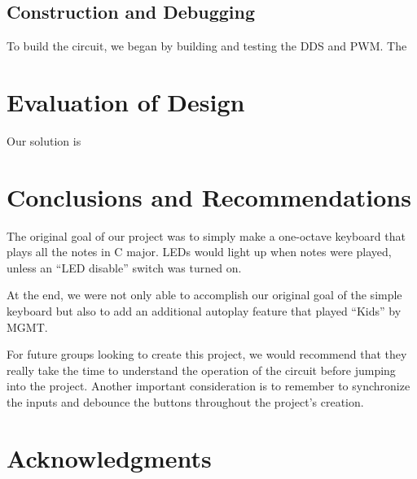 \documentclass{article}
\begin{document}
  \subsection{Construction and Debugging}


    To build the circuit, we began by building and testing the DDS and PWM. The

\section{Evaluation of Design}
  

  Our solution is 

\section{Conclusions and Recommendations}


  The original goal of our project was to simply make a one-octave keyboard that plays all the notes in C major. LEDs would light up when notes were played, unless an ``LED disable'' switch was turned on.

  At the end, we were not only able to accomplish our original goal of the simple keyboard but also to add an additional autoplay feature that played ``Kids'' by MGMT.

  For future groups looking to create this project, we would recommend that they really take the time to understand the operation of the circuit before jumping into the project. Another important consideration is to remember to synchronize the inputs and debounce the buttons throughout the project's creation.

\newpage
\section{Acknowledgments}
\end{document}
